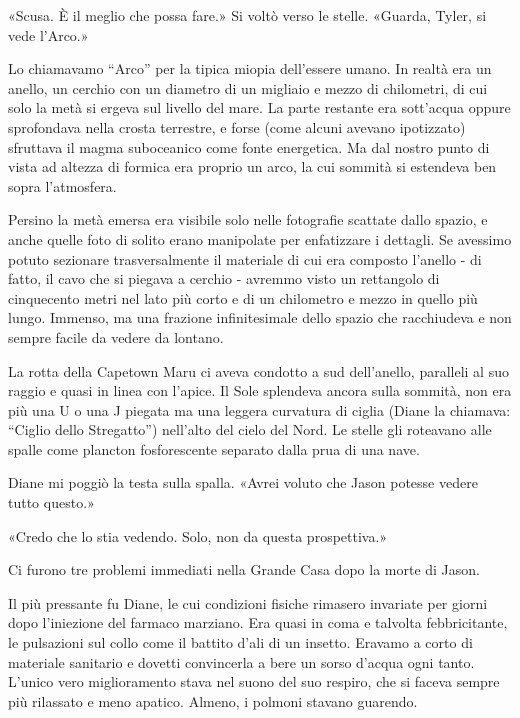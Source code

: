 «Scusa. È il meglio che possa fare.» Si voltò verso le stelle. «Guarda,
Tyler, si vede l'Arco.»

Lo chiamavamo ``Arco'' per la tipica miopia dell'essere umano. In realtà
era un anello, un cerchio con un diametro di un migliaio e mezzo di
chilometri, di cui solo la metà si ergeva sul livello del mare. La parte
restante era sott'acqua oppure sprofondava nella crosta terrestre, e
forse (come alcuni avevano ipotizzato) sfruttava il magma suboceanico
come fonte energetica. Ma dal nostro punto di vista ad altezza di
formica era proprio un arco, la cui sommità si estendeva ben sopra
l'atmosfera.

Persino la metà emersa era visibile solo nelle fotografie scattate dallo
spazio, e anche quelle foto di solito erano manipolate per enfatizzare i
dettagli. Se avessimo potuto sezionare trasversalmente il materiale di
cui era composto l'anello - di fatto, il cavo che si piegava a cerchio -
avremmo visto un rettangolo di cinquecento metri nel lato più corto e di
un chilometro e mezzo in quello più lungo. Immenso, ma una frazione
infinitesimale dello spazio che racchiudeva e non sempre facile da
vedere da lontano.

La rotta della Capetown Maru ci aveva condotto a sud dell'anello,
paralleli al suo raggio e quasi in linea con l'apice. Il Sole splendeva
ancora sulla sommità, non era più una U o una J piegata ma una leggera
curvatura di ciglia (Diane la chiamava: ``Ciglio dello Stregatto'')
nell'alto del cielo del Nord. Le stelle gli roteavano alle spalle come
plancton fosforescente separato dalla prua di una nave.

Diane mi poggiò la testa sulla spalla. «Avrei voluto che Jason potesse
vedere tutto questo.»

«Credo che lo stia vedendo. Solo, non da questa prospettiva.»

\separatorefiori

Ci furono tre problemi immediati nella Grande Casa dopo la morte di
Jason.

Il più pressante fu Diane, le cui condizioni fisiche rimasero invariate
per giorni dopo l'iniezione del farmaco marziano. Era quasi in coma e
talvolta febbricitante, le pulsazioni sul collo come il battito d'ali di
un insetto. Eravamo a corto di materiale sanitario e dovetti convincerla
a bere un sorso d'acqua ogni tanto. L'unico vero miglioramento stava nel
suono del suo respiro, che si faceva sempre più rilassato e meno
apatico. Almeno, i polmoni stavano guarendo.

